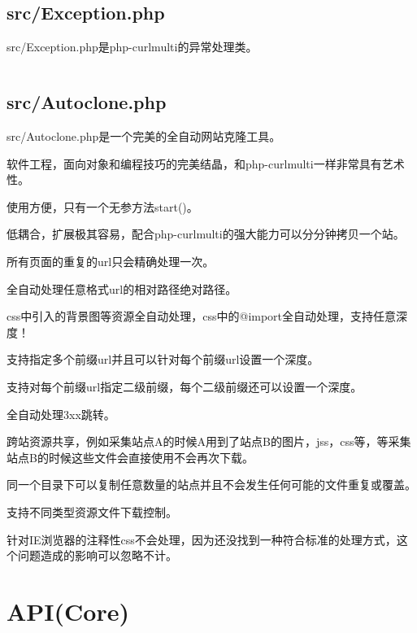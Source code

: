 \subsection{src/Exception.php}

src/Exception.php是php-curlmulti的异常处理类。



\begin{lstlisting}[language=PHP]

\end{lstlisting}

\subsection{src/Autoclone.php}

src/Autoclone.php是一个完美的全自动网站克隆工具。


\begin{compactitem}
\item 软件工程，面向对象和编程技巧的完美结晶，和php-curlmulti一样非常具有艺术性。
\item 使用方便，只有一个无参方法start()。
\item 低耦合，扩展极其容易，配合php-curlmulti的强大能力可以分分钟拷贝一个站。
\item 所有页面的重复的url只会精确处理一次。
\item 全自动处理任意格式url的相对路径绝对路径。
\item css中引入的背景图等资源全自动处理，css中的@import全自动处理，支持任意深度！
\item 支持指定多个前缀url并且可以针对每个前缀url设置一个深度。
\item 支持对每个前缀url指定二级前缀，每个二级前缀还可以设置一个深度。
\item 全自动处理3xx跳转。
\item 跨站资源共享，例如采集站点A的时候A用到了站点B的图片，jss，css等，等采集站点B的时候这些文件会直接使用不会再次下载。
\item 同一个目录下可以复制任意数量的站点并且不会发生任何可能的文件重复或覆盖。
\item 支持不同类型资源文件下载控制。
\end{compactitem}


针对IE浏览器的注释性css不会处理，因为还没找到一种符合标准的处理方式，这个问题造成的影响可以忽略不计。


\section{API(Core)}








